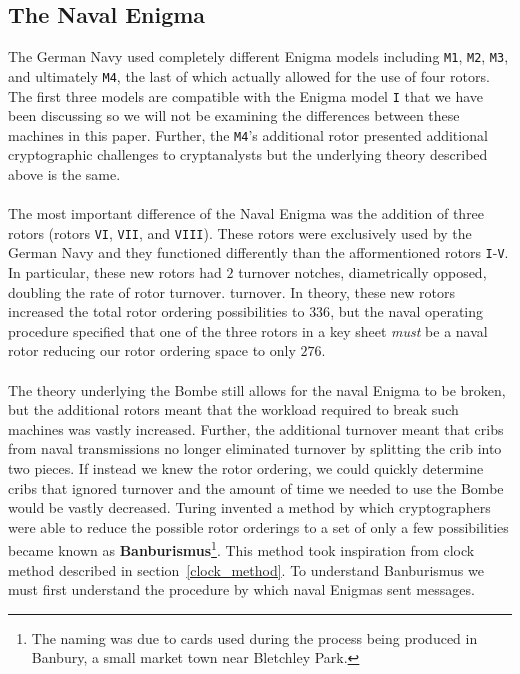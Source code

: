 \subsection{The Naval Enigma}
The German Navy used completely different Enigma models including
\texttt{M1}, \texttt{M2}, \texttt{M3}, and ultimately \texttt{M4},
the last of which actually allowed for the use of four rotors. The
first three models are compatible with the Enigma model \texttt{I}
that we have been discussing so we will not be examining the
differences between these machines in this paper. Further, the
\texttt{M4}'s additional rotor presented additional cryptographic
challenges to cryptanalysts but the underlying theory described above
is the same.
\\\\The most important difference of the Naval Enigma was the
addition of three rotors (rotors \texttt{VI}, \texttt{VII}, and
\texttt{VIII}). These rotors were exclusively used by the German Navy
and they functioned differently than the afformentioned rotors
\texttt{I}-\texttt{V}. In particular, these new rotors had $2$
turnover notches, diametrically opposed, doubling the rate of rotor turnover.
turnover. In theory, these new rotors increased the total rotor
ordering possibilities to $336$, but the naval operating procedure
specified that one of the three rotors in a key sheet \emph{must} be
a naval rotor reducing our rotor ordering space to only $276$.
\\\\The theory underlying the Bombe still allows for the naval Enigma
to be broken, but the additional rotors meant that the workload
required to break such machines was vastly increased. Further, the
additional turnover meant that cribs from naval transmissions no
longer eliminated turnover by splitting the crib into two pieces. If
instead we knew the rotor ordering, we could quickly determine cribs
that ignored turnover and the amount of time we needed to use the
Bombe would be vastly decreased. Turing invented a method by which cryptographers
were able to reduce the possible rotor orderings to a set of only a
few possibilities became known as {\bf{Banburismus}}\footnote{The naming was due to cards used during the process being produced in Banbury, a small market town near Bletchley Park.}. This method took
inspiration from clock method described in
section~\ref{clock_method}. To understand Banburismus we must first
understand the procedure by which naval Enigmas sent messages.

